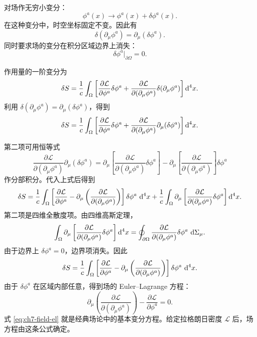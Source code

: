 对场作无穷小变分：
\[
\phi^{a}(x)\rightarrow \phi^{a}(x)+\delta\phi^{a}(x).
\]
在这种变分中，时空坐标固定不变。因此有
\[
\delta(\partial_{\mu}\phi^{a})=\partial_{\mu}(\delta\phi^{a}).
\]
同时要求场的变分在积分区域边界上消失：
\[
\delta\phi^{a}\big|_{\partial\Omega}=0.
\]

作用量的一阶变分为
\[
\delta S
=
\frac{1}{c}
\int_{\Omega}
\left[
\frac{\partial\mathcal{L}}{\partial\phi^{a}}\delta\phi^{a}
+
\frac{\partial\mathcal{L}}{\partial(\partial_{\mu}\phi^{a})}
\delta(\partial_{\mu}\phi^{a})
\right]\mathop{}\!\mathrm{d}^{4}x.
\]
利用 $\delta(\partial_{\mu}\phi^{a})=\partial_{\mu}(\delta\phi^{a})$，得到
\[
\delta S
=
\frac{1}{c}
\int_{\Omega}
\left[
\frac{\partial\mathcal{L}}{\partial\phi^{a}}\delta\phi^{a}
+
\frac{\partial\mathcal{L}}{\partial(\partial_{\mu}\phi^{a})}
\partial_{\mu}(\delta\phi^{a})
\right]\mathop{}\!\mathrm{d}^{4}x.
\]

第二项可用恒等式
\[
\frac{\partial\mathcal{L}}{\partial(\partial_{\mu}\phi^{a})}
\partial_{\mu}(\delta\phi^{a})
=
\partial_{\mu}\left[
\frac{\partial\mathcal{L}}{\partial(\partial_{\mu}\phi^{a})}
\delta\phi^{a}
\right]
-
\partial_{\mu}\left[
\frac{\partial\mathcal{L}}{\partial(\partial_{\mu}\phi^{a})}
\right]\delta\phi^{a}
\]
作分部积分。代入上式后得到
\[
\delta S
=
\frac{1}{c}
\int_{\Omega}
\left[
\frac{\partial\mathcal{L}}{\partial\phi^{a}}
-
\partial_{\mu}\left(
\frac{\partial\mathcal{L}}{\partial(\partial_{\mu}\phi^{a})}
\right)
\right]\delta\phi^{a}\,\mathop{}\!\mathrm{d}^{4}x
+
\frac{1}{c}
\int_{\Omega}
\partial_{\mu}\left[
\frac{\partial\mathcal{L}}{\partial(\partial_{\mu}\phi^{a})}
\delta\phi^{a}
\right]\mathop{}\!\mathrm{d}^{4}x.
\]
第二项是四维全散度项。由四维高斯定理，
\[
\int_{\Omega}
\partial_{\mu}\left[
\frac{\partial\mathcal{L}}{\partial(\partial_{\mu}\phi^{a})}
\delta\phi^{a}
\right]\mathop{}\!\mathrm{d}^{4}x
=
\oint_{\partial\Omega}
\frac{\partial\mathcal{L}}{\partial(\partial_{\mu}\phi^{a})}
\delta\phi^{a}\,\mathop{}\!\mathrm{d}\Sigma_{\mu}.
\]
由于边界上 $\delta\phi^{a}=0$，边界项消失。因此
\[
\delta S
=
\frac{1}{c}
\int_{\Omega}
\left[
\frac{\partial\mathcal{L}}{\partial\phi^{a}}
-
\partial_{\mu}\left(
\frac{\partial\mathcal{L}}{\partial(\partial_{\mu}\phi^{a})}
\right)
\right]\delta\phi^{a}\,\mathop{}\!\mathrm{d}^{4}x.
\]
由于 $\delta\phi^{a}$ 在区域内部任意，得到场的 Euler--Lagrange 方程：
\begin{equation}
	\partial_{\mu}\left(
	\frac{\partial\mathcal{L}}{\partial(\partial_{\mu}\phi^{a})}
	\right)
	-
	\frac{\partial\mathcal{L}}{\partial\phi^{a}}
	=0.
	\label{eq:ch7-field-el}
\end{equation}
式 \eqref{eq:ch7-field-el} 就是经典场论中的基本变分方程。给定拉格朗日密度 $\mathcal{L}$ 后，场方程由这条公式确定。

